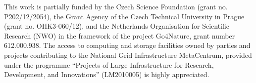  This work is partially funded by the Czech Science Foundation (grant no. P202/12/2054), the Grant
Agency of the Czech Technical University in Prague (grant no. OHK3-060/12), and the Netherlands
Organisation for Scientific Research (NWO) in the framework of the project Go4Nature, grant number 612.000.938. 
The access to computing and storage facilities owned by parties and projects contributing to the National Grid 
Infrastructure MetaCentrum, provided under the 
programme ``Projects of Large Infrastructure for Research, Development, and Innovations'' (LM2010005) is highly appreciated.

